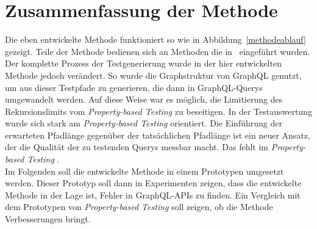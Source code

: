 \section{Zusammenfassung der Methode}

Die eben entwickelte Methode funktioniert so wie in Abbildung~\ref{methodeablauf} gezeigt.
Teile der Methode bedienen sich an Methoden die in~\cite{property-based-testing} eingeführt wurden.
Der komplette Prozess der Testgenerierung wurde in der hier entwickelten Methode jedoch verändert.
So wurde die Graphstruktur von GraphQL genutzt, um aus dieser Testpfade zu generieren, die dann in GraphQL-Querys umgewandelt werden.
Auf diese Weise war es möglich, die Limitierung des Rekursionslimits vom \textit{Property-based Testing} zu beseitigen.
In der Testauswertung wurde sich stark am \textit{Property-based Testing} orientiert.
Die Einführung der erwarteten Pfadlänge gegenüber der tatsächlichen Pfadlänge ist ein neuer Ansatz, der die Qualität der zu testenden Querys
messbar macht.
Das fehlt im \textit{Property-based Testing} .
\\


Im Folgenden soll die entwickelte Methode in einem Prototypen umgesetzt werden.
Dieser Prototyp soll dann in Experimenten zeigen, dass die entwickelte Methode in der Lage ist, Fehler in GraphQL-APIs zu finden.
Ein Vergleich mit dem Prototypen von \textit{Property-based Testing} soll zeigen, ob die Methode Verbesserungen bringt.







